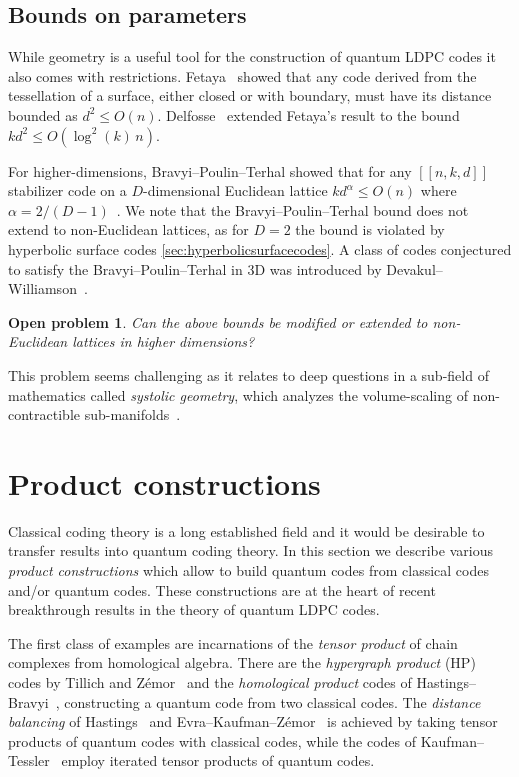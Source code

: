 \documentclass[amsmath, amssymb, floatfix, reprint, twocolumn, notitlepage, 10pt]{revtex4-1}
\newcommand{\change}{}
\newtheorem*{oproblem}{Open problem}
\begin{document}
\subsection{Bounds on parameters}
{\change 
While geometry is a useful tool for the construction of quantum LDPC codes it also comes with restrictions.
Fetaya~\cite{fetaya2012bounding} showed that any code derived from the tessellation of a surface, either closed or with boundary, must have its distance bounded as $d^2 \leq O(n)$.
Delfosse~\cite{delfosse2013tradeoffs} extended Fetaya's result to the bound $k d^2 \leq O(\log^2(k)\, n)$.

For higher-dimensions, Bravyi--Poulin--Terhal showed that for any $[[n,k,d]]$ stabilizer code on a $D$-dimensional Euclidean lattice $k d^\alpha \leq O(n)$ where $\alpha = 2/(D-1)$~\cite{bravyi2010tradeoffs}.
We note that the Bravyi--Poulin--Terhal bound does not extend to non-Euclidean lattices, as for $D=2$ the bound is violated by hyperbolic surface codes \cref{sec:hyperbolicsurfacecodes}.
%
A class of codes conjectured to satisfy the Bravyi--Poulin--Terhal in 3D was introduced by Devakul--Williamson~\cite{devakul2021fractalizing}.

\begin{oproblem}
Can the above bounds be modified or extended to non-Euclidean lattices in higher dimensions?
\end{oproblem}
This problem seems challenging as it relates to deep questions in a sub-field of mathematics called \emph{systolic geometry}, which analyzes the volume-scaling of non-contractible sub-manifolds~\cite{katz2007systolic}.
}

\section{Product constructions}\label{sec:product_constructions}
%
%
%
%
%
%
%
%
%

Classical coding theory is a long established field and it would be desirable to transfer results into quantum coding theory.
In this section we describe various \emph{product constructions} which allow to build quantum codes from classical codes and/or quantum codes.
{\change These constructions} are at the heart of recent breakthrough results in the theory of quantum LDPC codes.

The first class of examples are incarnations of the \emph{tensor product} of chain complexes from homological algebra. 
There are the \emph{hypergraph product} (HP) codes by Tillich and Z\'emor~\cite{tillich2013quantum} and the \emph{homological product} codes of Hastings--Bravyi~\cite{bravyi2014homological}, constructing a quantum code from two classical codes. 
The \emph{distance balancing} of Hastings~\cite{hastings2016weight} and Evra--Kaufman--Zémor~\cite{evra_decodable_2020} is achieved by taking tensor products  of quantum codes with classical codes, while the codes of Kaufman--Tessler~\cite{kaufman2020new} employ iterated tensor products of quantum codes.
\end{document}
